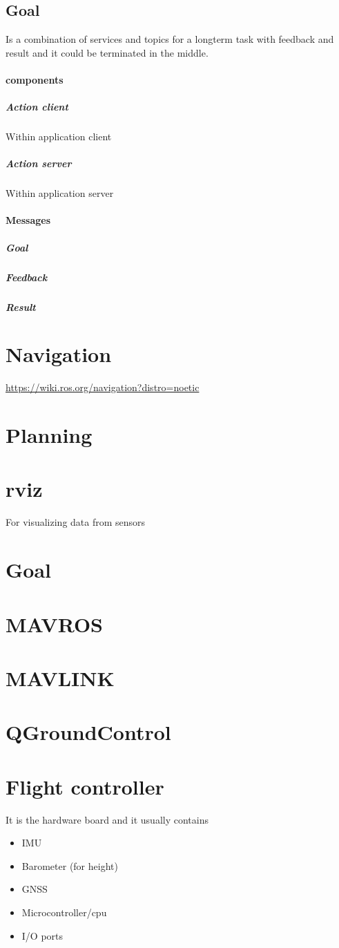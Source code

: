     \subsection{Goal}

Is a combination of services and topics for a longterm task with feedback and result and it could be terminated in the middle.
    \paragraph{components}
        \subparagraph{Action client}
            Within application client
        \subparagraph{Action server}
            Within application server
    
    \paragraph{Messages}
        \subparagraph{Goal}
        \subparagraph{Feedback}
        \subparagraph{Result}

\section{Navigation}
    \url{https://wiki.ros.org/navigation?distro=noetic}

\section{Planning}
\section{rviz}
    For visualizing data from sensors

\section{Goal}
\section{MAVROS}
\section{MAVLINK}
\section{QGroundControl}
\section{Flight controller}
    It is the hardware board and it usually contains
    \begin{itemize}
        \item IMU
        \item Barometer (for height)
        \item GNSS
        \item Microcontroller/cpu
        \item I/O ports
    \end{itemize}

